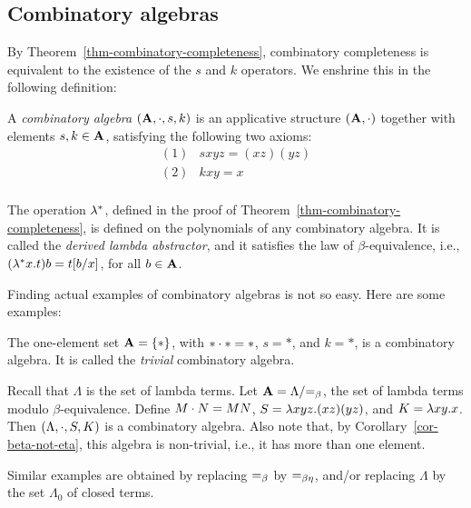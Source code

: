 \documentclass{article}
\begin{document}
\subsection{Combinatory algebras}\label{ssec-comb-alg}

By Theorem~\ref{thm-combinatory-completeness}, combinatory
completeness is equivalent to the existence of the $s$ and $k$
operators. We enshrine this in the following definition:

\begin{definition}
  A {\em combinatory algebra} $({\bf A},\cdot,s,k)$ is an applicative
  structure $({\bf A},\cdot)$ together with elements $s,k\in{\bf A}$,
  satisfying the following two axioms:
    \[ \begin{array}{ll}
    (1) & sxyz = (xz)(yz) \\
    (2) & kxy = x \\
  \end{array}
  \]
\end{definition}

\begin{remark}\label{rem-derived-lambda}
  The operation $\lambda^*$, defined in the proof of
  Theorem~\ref{thm-combinatory-completeness}, is defined on the
  polynomials of any combinatory algebra. It is called the {\em derived
    lambda abstractor}, and it satisfies the law of $\beta$-equivalence,
  i.e., $(\lambda^*x.t)b = t[b/x]$, for all $b\in{\bf A}$.
\end{remark}

Finding actual examples of combinatory algebras is not so easy. Here
are some examples:

\begin{example}
  The one-element set ${\bf A}=\{*\}$, with $*\cdot *=*$, $s=*$, and $k=*$,
  is a combinatory algebra. It is called the {\em trivial} combinatory
  algebra. 
\end{example}

\begin{example}
  Recall that $\Lambda$ is the set of lambda terms. Let
  ${\bf A}=\Lambda/{=_{\beta}}$, the set of lambda terms modulo
  $\beta$-equivalence. Define $M\cdot N=MN$, $S=\lambda xyz.(xz)(yz)$,
  and $K=\lambda xy.x$. Then $(\Lambda,\cdot,S,K)$ is a combinatory
  algebra. Also note that, by Corollary~\ref{cor-beta-not-eta}, this
  algebra is non-trivial, i.e., it has more than one element.
  
  Similar examples are obtained by replacing $=_{\beta}$ by $=_{\beta\eta}$, and/or
  replacing $\Lambda$ by the set $\Lambda_0$ of closed terms.
\end{example}
\end{document}
